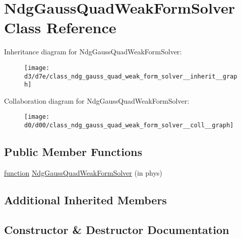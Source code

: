 \hypertarget{class_ndg_gauss_quad_weak_form_solver}{}\section{Ndg\+Gauss\+Quad\+Weak\+Form\+Solver Class Reference}
\label{class_ndg_gauss_quad_weak_form_solver}


Inheritance diagram for Ndg\+Gauss\+Quad\+Weak\+Form\+Solver\+:
\nopagebreak
\begin{figure}[H]
\begin{center}
\leavevmode
\texttt{[image: d3/d7e/class\_ndg\_gauss\_quad\_weak\_form\_solver\_\_inherit\_\_graph]}
\end{center}
\end{figure}


Collaboration diagram for Ndg\+Gauss\+Quad\+Weak\+Form\+Solver\+:
\nopagebreak
\begin{figure}[H]
\begin{center}
\leavevmode
\texttt{[image: d0/d00/class\_ndg\_gauss\_quad\_weak\_form\_solver\_\_coll\_\_graph]}
\end{center}
\end{figure}
\subsection*{Public Member Functions}
\begin{DoxyCompactItemize}
\item 
\hyperlink{class_ndg_gauss_quad_strong_form_solver_af755d69cea40fa91c0aab6b13409e11f}{function} \hyperlink{class_ndg_gauss_quad_weak_form_solver_a55afbf48cdf3d03b38ce81c634d34d8e}{Ndg\+Gauss\+Quad\+Weak\+Form\+Solver} (in phys)
\end{DoxyCompactItemize}
\subsection*{Additional Inherited Members}


\subsection{Constructor \& Destructor Documentation}
\mbox{\label{class_ndg_gauss_quad_weak_form_solver_a55afbf48cdf3d03b38ce81c634d34d8e}} 
